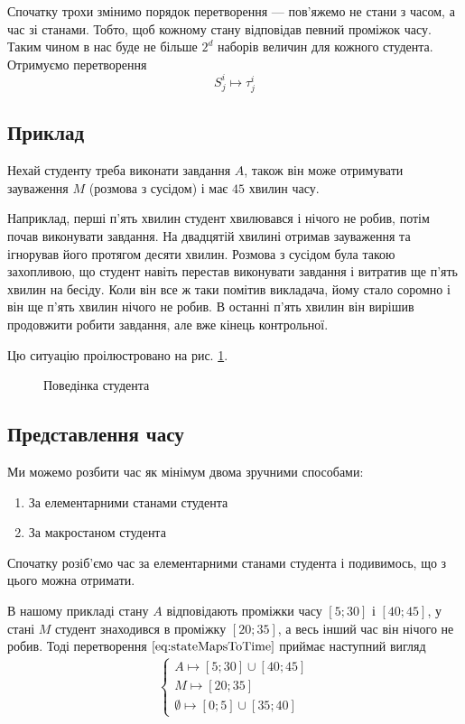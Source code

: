 Спочатку трохи змінимо порядок перетворення --- пов’яжемо не стани з часом,
а час зі станами.
Тобто, щоб кожному стану відповідав певний проміжок часу.
Таким чином в нас буде не більше $2^d$ наборів величин для кожного студента.
Отримуємо перетворення
\begin{equation}\label{eq:stateMapsToTime}
  S_j^i \mapsto \tau_j^i
\end{equation}

\subsection{Приклад}
Нехай студенту треба виконати завдання $A$, також він може отримувати зауваження
$M$ (розмова з сусідом) і має $45$ хвилин часу.

Наприклад, перші п’ять хвилин студент хвилювався і нічого не робив, потім
почав виконувати завдання.
На двадцятій хвилині отримав зауваження та ігнорував його протягом десяти
хвилин.
Розмова з сусідом була такою захопливою, що студент навіть перестав виконувати
завдання і витратив ще п’ять хвилин на бесіду.
Коли він все ж таки помітив викладача, йому стало соромно і він ще п’ять хвилин
нічого не робив.
В останні п’ять хвилин він вирішив продовжити робити завдання, але вже кінець
контрольної.

Цю ситуацію проілюстровано на рис. \ref{fig:tikz:studentBehaviorSimple}.

\begin{figure}[h]
  \center
  \caption{Поведінка студента}
  \label{fig:tikz:studentBehaviorSimple}
\end{figure}

\subsection{Представлення часу}
Ми можемо розбити час як мінімум двома зручними способами:
\begin{enumerate}
  \item
    За елементарними станами студента
  \item
    За макростаном студента
\end{enumerate}

Спочатку розіб’ємо час за елементарними станами студента і подивимось, що з
цього можна отримати.

В нашому прикладі стану $A$ відповідають проміжки часу $\left[ 5; 30 \right]$ і
$\left[ 40; 45 \right]$, у стані $M$ студент знаходився в проміжку
$\left[ 20; 35 \right]$, а весь інший час він нічого не робив.
Тоді перетворення $\eqref{eq:stateMapsToTime}$ приймає наступний вигляд
\begin{align*}
  \begin{cases}
    A \mapsto \left[ 5; 30 \right] \cup \left[ 40; 45 \right] \\
    M \mapsto \left[ 20; 35 \right] \\
    \emptyset \mapsto \left[ 0; 5 \right] \cup \left[ 35; 40 \right]
  \end{cases}
\end{align*}

